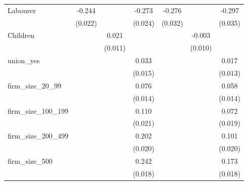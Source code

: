{\begin{tabular}{l*{6}{c}}
Labourer            &      -0.244\sym{***}&                     &      -0.273\sym{***}&      -0.276\sym{***}&                     &      -0.297\sym{***}\\
                    &     (0.022)         &                     &     (0.024)         &     (0.032)         &                     &     (0.035)         \\
Children            &                     &       0.021\sym{*}  &                     &                     &      -0.003         &                     \\
                    &                     &     (0.011)         &                     &                     &     (0.010)         &                     \\
union\_yes           &                     &                     &       0.033\sym{**} &                     &                     &       0.017         \\
                    &                     &                     &     (0.015)         &                     &                     &     (0.013)         \\
firm\_size\_20\_99     &                     &                     &       0.076\sym{***}&                     &                     &       0.058\sym{***}\\
                    &                     &                     &     (0.014)         &                     &                     &     (0.014)         \\
firm\_size\_100\_199   &                     &                     &       0.110\sym{***}&                     &                     &       0.072\sym{***}\\
                    &                     &                     &     (0.021)         &                     &                     &     (0.019)         \\
firm\_size\_200\_499   &                     &                     &       0.202\sym{***}&                     &                     &       0.101\sym{***}\\
                    &                     &                     &     (0.020)         &                     &                     &     (0.020)         \\
firm\_size\_500       &                     &                     &       0.242\sym{***}&                     &                     &       0.173\sym{***}\\
                    &                     &                     &     (0.018)         &                     &                     &     (0.018)         \\

\end{tabular}}
